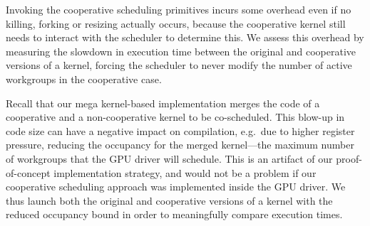 \documentclass[sigconf]{acmart}
\begin{document}
{%
%
%
%

Invoking the cooperative scheduling primitives incurs some overhead
even if no killing, forking or resizing actually occurs, because the cooperative kernel still needs to interact with the scheduler to determine this.
We assess this overhead by measuring the
 slowdown in execution time between the original and cooperative versions of a kernel, forcing the scheduler to never modify the number of
active workgroups in the cooperative case.

Recall that our mega kernel-based implementation merges the code of a
cooperative and a non-cooperative kernel to be co-scheduled.  This
blow-up in code size can have a negative impact on compilation, e.g.\
due to higher register pressure, reducing the occupancy for the merged
kernel---the maximum number of workgroups that the GPU driver will
schedule.  This is an artifact of our proof-of-concept implementation
strategy, and would not be a problem if our cooperative scheduling
approach was implemented inside the GPU driver.  We thus launch both the
original and cooperative versions of a kernel with the reduced occupancy
bound in order to meaningfully compare execution times.

}
\end{document}
